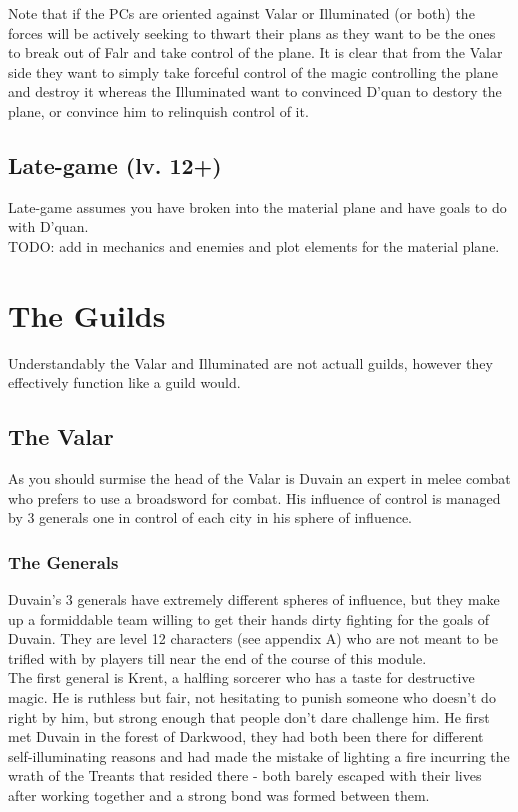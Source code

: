 \documentclass[10pt,twoside,twocolumn]{article}
\begin{document}
Note that if the PCs are oriented against Valar or Illuminated (or both) the forces will be actively seeking to thwart their plans as they want to be the ones to break out of Falr and take control of the plane. It is clear that from the Valar side they want to simply take forceful control of the magic controlling the plane and destroy it whereas the Illuminated want to convinced D'quan to destory the plane, or convince him to relinquish control of it.\\

\subsection{Late-game (lv. 12+)}
Late-game assumes you have broken into the material plane and have goals to do with D'quan.\\

TODO: add in mechanics and enemies and plot elements for the material plane.

\section{The Guilds}
Understandably the Valar and Illuminated are not actuall guilds, however they effectively function like a guild would.\\

\subsection{The Valar}
As you should surmise the head of the Valar is Duvain an expert in melee combat who prefers to use a broadsword for combat. His influence of control is managed by 3 generals one in control of each city in his sphere of influence.\\

\subsubsection{The Generals}
Duvain's 3 generals have extremely different spheres of influence, but they make up a formiddable team willing to get their hands dirty fighting for the goals of Duvain. They are level 12 characters (see appendix A) who are not meant to be trifled with by players till near the end of the course of this module.\\

The first general is Krent, a halfling sorcerer who has a taste for destructive magic. He is ruthless but fair, not hesitating to punish someone who doesn't do right by him, but strong enough that people don't dare challenge him. He first met Duvain in the forest of Darkwood, they had both been there for different self-illuminating reasons and had made the mistake of lighting a fire incurring the wrath of the Treants that resided there - both barely escaped with their lives after working together and a strong bond was formed between them.\\
\end{document}
